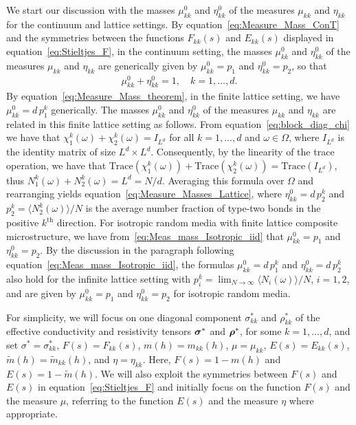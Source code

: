 \documentclass{cmslatex}
\newcommand\bsig{\mbox{\boldmath${\sigma}$}}
\newcommand\brho{\mbox{\boldmath${\rho}$}}
\begin{document}
We start our discussion with the masses $\mu_{kk}^0$ and $\eta_{kk}^0$ of
the measures $\mu_{kk}$ and $\eta_{kk}$ for the continuum and 
lattice settings. By equation~\eqref{eq:Measure_Mass_ConT} and  
the symmetries between the functions $F_{kk}(s)$ and $E_{kk}(s)$
displayed in equation~\eqref{eq:Stieltjes_F}, in the continuum setting,
the masses $\mu_{kk}^0$ and $\eta_{kk}^0$ of the measures $\mu_{kk}$ and
$\eta_{kk}$ are generically given by $\mu_{kk}^0=p_1$ and $\eta_{kk}^0=p_2$, so that
%
\begin{align}\label{eq:Measure_Masses_Lattice}
  \mu_{kk}^0+\eta_{kk}^0=1, \quad  k=1,\ldots,d.
\end{align}
%
By equation~\eqref{eq:Measure_Mass_theorem}, in
the finite lattice setting, we have $\mu_{kk}^0=d\,p_1^k$ generically. The masses
$\mu_{kk}^0$ and $\eta_{kk}^0$ of the measures $\mu_{kk}$ and $\eta_{kk}$ are
related in this finite lattice setting as follows. From
equation~\eqref{eq:block_diag_chi} we have that
$\chi_1^k(\omega)+\chi_2^k(\omega)=I_{L^d}$ for 
all $k=1,\ldots,d$ and $\omega\in\Omega$, where $I_{L^d}$ is the identity matrix of
size $L^d\times L^d$. Consequently, by the linearity of the trace
operation, we have that
$\text{Trace}(\chi_1^k(\omega))+\text{Trace}(\chi_2^k(\omega))=\text{Trace}(I_{L^d})$,     
thus $N_1^k(\omega)+N_2^k(\omega)=L^d=N/d$. Averaging this formula
over $\Omega$ and rearranging yields equation~\eqref{eq:Measure_Masses_Lattice},
where $\eta_{kk}^0=d\,p_2^k$ and $p_2^k=\langle N_2^k(\omega)\rangle/N$ is the average
number fraction of type-two bonds in the positive $k^{\text{th}}$
direction. For isotropic random media with finite lattice composite
microstructure, we have from~\eqref{eq:Meas_mass_Isotropic_iid} that
$\mu_{kk}^0=p_1$ and $\eta_{kk}^0=p_2$. By the discussion in the paragraph
following equation~\eqref{eq:Meas_mass_Isotropic_iid}, the formulas
$\mu_{kk}^0=d\,p_1^k$ and $\eta_{kk}^0=d\,p_2^k$ also hold for the infinite
lattice setting with $p_i^k=\lim_{N\to\infty}\langle N_i(\omega)\rangle/N$, $i=1,2$, and are
given by $\mu_{kk}^0=p_1$ and $\eta_{kk}^0=p_2$ for isotropic random media.  


 
For simplicity, we will focus on one diagonal component $\sigma^*_{kk}$ and
$\rho^*_{kk}$ of the effective conductivity and resistivity tensors
$\bsig^*$ and $\brho^*$, for some $k=1,\ldots,d$, and set $\sigma^*=\sigma_{kk}^*$,
$F(s)=F_{kk}(s)$, $m(h)=m_{kk}(h)$, $\mu=\mu_{kk}$, $E(s)=E_{kk}(s)$,
$\tilde{m}(h)=\tilde{m}_{kk}(h)$, and $\eta=\eta_{kk}$. 
Here,
$F(s)=1-m(h)$ and $E(s)=1-\tilde{m}(h)$.
We will also exploit the symmetries between
$F(s)$ and $E(s)$ in equation~\eqref{eq:Stieltjes_F} and initially 
focus on the function $F(s)$ and the measure $\mu$, referring to the
function $E(s)$ and the measure $\eta$ where appropriate. 
\end{document}
